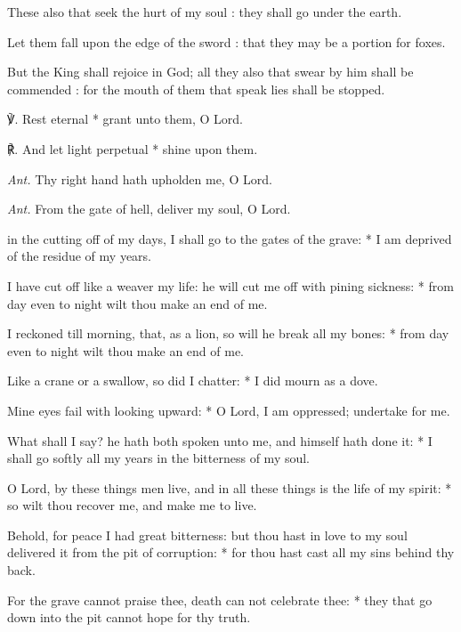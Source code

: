 These also that seek the hurt of my soul : they shall go under the earth.\par
{}Let them fall upon the edge of the sword : that they may be a portion for foxes.\par
{}But the King shall rejoice in God; all they also that swear by him shall be commended : for the mouth of them that speak lies shall be stopped.\par
℣. Rest eternal * grant unto them, O Lord.\par
℟. And let light perpetual * shine upon them.\par\noindent
\textit{Ant.} Thy right hand hath upholden me, O Lord.\par
{}\par\noindent
\textit{Ant.} From the gate of hell, {\dag} deliver my soul, O Lord.\par
{} in the cutting off of my days, {\dag} I shall go to the gates of the grave: * I am deprived of the residue of my years.\par
{}
I have cut off like a weaver my life: {\dag} he will cut me off with pining sickness: * from day even to night wilt thou make an end of me.\par
I reckoned till morning, {\dag} that, as a lion, so will he break all my bones: * from day even to night wilt thou make an end of me.\par
Like a crane or a swallow, so did I chatter: * I did mourn as a dove.\par
Mine eyes fail with looking upward: * O Lord, I am oppressed; undertake for me.\par
What shall I say? {\dag} he hath both spoken unto me, and himself hath done it: * I shall go softly all my years in the bitterness of my soul.\par
O Lord, by these things men live, {\dag} and in all these things is the life of my spirit: * so wilt thou recover me, and make me to live.\par
Behold, for peace I had great bitterness: {\dag} but thou hast in love to my soul delivered it from the pit of corruption: * for thou hast cast all my sins behind thy back.\par
For the grave cannot praise thee, {\dag} death can not celebrate thee: * they that go down into the pit cannot hope for thy truth.\par
